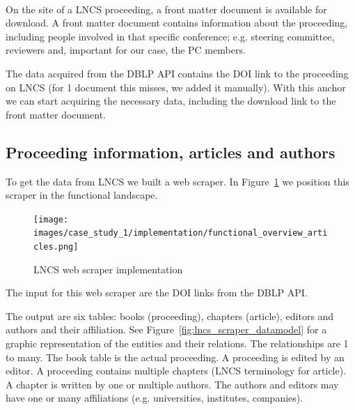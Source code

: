 \documentclass{ou-report}
\newcommand{\doi}{{DOI}}
\newcommand{\lncs}{LNCS}
\newcommand{\dblp}{DBLP}
\newcommand{\api}{API}
\begin{document}
\paragraph{}
On the site of a \lncs{} proceeding, a front matter document is available for
download. A front matter document contains information about the proceeding,
including people involved in that specific conference; e.g. steering committee,
reviewers and, important for our case, the PC members.

The data acquired from the \dblp{} \api{} contains the \doi{} link to 
the proceeding on \lncs{} (for 1 document this misses, we added it manually). 
With this anchor we can start acquiring the necessary data, including the 
download link to the front matter document.

\newpage
\subsection{Proceeding information, articles and authors}
\label{subsec:springer_website}
To get the data from \lncs{} we built a web scraper. In 
Figure~\ref{fig:functional_overview_articles} we position this scraper in the 
functional landscape.

\begin{figure}[H]
    \centering
    \texttt{[image: images/case\_study\_1/implementation/functional\_overview\_articles.png]}
    \caption{LNCS web scraper implementation}
    \label{fig:functional_overview_articles}
\end{figure}

The input for this web scraper are the \doi{} links from the \dblp{} \api{}.

The output are six tables: books (proceeding), chapters (article), editors and 
authors and their affiliation. See Figure~\ref{fig:lncs_scraper_datamodel} for 
a graphic representation of the 
entities and their relations. The relationships are 1 to many.
The book table is the actual proceeding. A proceeding is edited by an editor. 
A proceeding contains multiple chapters (\lncs{} terminology for article). A
chapter is written by one or multiple authors. The authors and editors may 
have one or many affiliations (e.g. universities, institutes, companies).
\end{document}
